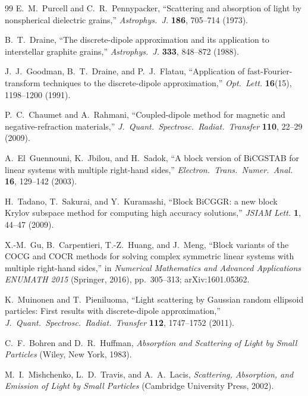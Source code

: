 \documentclass[11pt,a4paper]{article}
\begin{document}
\begin{thebibliography}{99}
  E.~M.~Purcell and C.~R.~Pennypacker,
  ``Scattering and absorption of light by nonspherical dielectric grains,''
  \textit{Astrophys.\ J.} \textbf{186}, 705--714 (1973).

  B.~T.~Draine,
  ``The discrete-dipole approximation and its application to interstellar
  graphite grains,''
  \textit{Astrophys.\ J.} \textbf{333}, 848--872 (1988).

  J.~J.~Goodman, B.~T.~Draine, and P.~J.~Flatau,
  ``Application of fast-Fourier-transform techniques to the discrete-dipole
  approximation,''
  \textit{Opt.\ Lett.} \textbf{16}(15), 1198--1200 (1991).

  P.~C.~Chaumet and A.~Rahmani,
  ``Coupled-dipole method for magnetic and negative-refraction materials,''
  \textit{J.\ Quant.\ Spectrosc.\ Radiat.\ Transfer} \textbf{110},
  22--29 (2009).

  A.~El~Guennouni, K.~Jbilou, and H.~Sadok,
  ``A block version of BiCGSTAB for linear systems with multiple
  right-hand sides,''
  \textit{Electron.\ Trans.\ Numer.\ Anal.} \textbf{16}, 129--142 (2003).

  H.~Tadano, T.~Sakurai, and Y.~Kuramashi,
  ``Block BiCGGR: a new block Krylov subspace method for computing high
  accuracy solutions,''
  \textit{JSIAM Lett.} \textbf{1}, 44--47 (2009).

  X.-M.~Gu, B.~Carpentieri, T.-Z.~Huang, and J.~Meng,
  ``Block variants of the COCG and COCR methods for solving complex
  symmetric linear systems with multiple right-hand sides,''
  in \textit{Numerical Mathematics and Advanced Applications ENUMATH 2015}
  (Springer, 2016), pp.~305--313; arXiv:1601.05362.

  K.~Muinonen and T.~Pieniluoma,
  ``Light scattering by Gaussian random ellipsoid particles: First results
  with discrete-dipole approximation,''
  \textit{J.\ Quant.\ Spectrosc.\ Radiat.\ Transfer} \textbf{112},
  1747--1752 (2011).

  C.~F.~Bohren and D.~R.~Huffman,
  \textit{Absorption and Scattering of Light by Small Particles}
  (Wiley, New York, 1983).

  M.~I.~Mishchenko, L.~D.~Travis, and A.~A.~Lacis,
  \textit{Scattering, Absorption, and Emission of Light by Small Particles}
  (Cambridge University Press, 2002).


\end{thebibliography}
\end{document}

